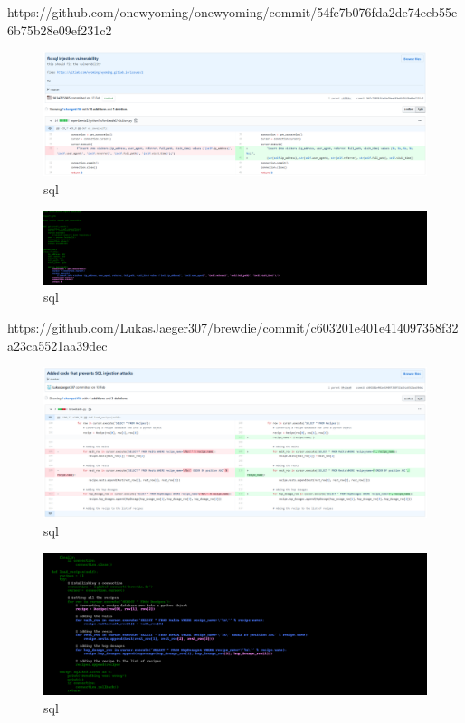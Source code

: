 \documentclass[
a4paper,
pagesize,
pdftex,
12pt,
twoside, %
BCOR=5mm, %
ngerman,
fleqn,
final,
]{scrartcl}
\begin{document}
https://github.com/onewyoming/onewyoming/commit/54fc7b076fda2de74eeb55e6b75b28e09ef231c2


\begin{figure}[h]
	\centering
	\includegraphics[width=\linewidth]{Images/sql3}
	\caption{sql}
	\label{fig:sql3}
\end{figure}
\begin{figure}[h]
	\centering
	\includegraphics[width=\linewidth]{Images/sql3r}
	\caption{sql}
	\label{fig:sql3r}
\end{figure}

https://github.com/LukasJaeger307/brewdie/commit/c603201e401e414097358f32a23ca5521aa39dec


\begin{figure}[h]
	\centering
	\includegraphics[width=\linewidth]{Images/sql4}
	\caption{sql}
	\label{fig:sql4}
\end{figure}
\begin{figure}[h]
	\centering
	\includegraphics[width=\linewidth]{Images/sql4r}
	\caption{sql}
	\label{fig:sql4r}
\end{figure}
\end{document}
